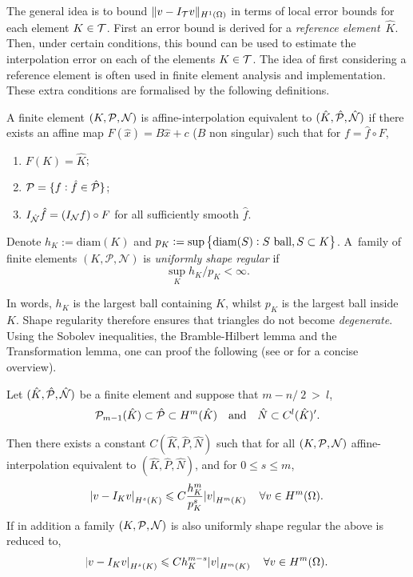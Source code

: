\documentclass[thesis.tex]{subfiles}
\begin{document}
  The general idea is to bound $\|v - I_{\mathcal{T}} v\|_{H^1(\O)}$ 
  in terms of local error bounds for each element $K \in \T$.
  First an error bound is derived for a \emph{reference element}~$\hat K$. 
  Then, under certain conditions, this bound can be used to estimate the interpolation error 
  on each of the elements $K \in \T$. The idea of first considering a reference element is often 
  used in finite element analysis and implementation. These extra conditions are formalised by the following definitions.
  \begin{defn}
    A finite element $(K, \P, \N)$ is affine-interpolation equivalent to $(\hat K, \hat \P, \hat \N)$ if there
    exists an affine map $ F(\hat x) = B\hat x + c$ ($B$ non singular) such that for $f = \hat f \circ F$,
    \begin{enumerate}[label=(\roman*)]
      \item $F(K) = \hat K$;
      \item $\P = \{f : \hat f \in \hat \P\}$;
    \item $I_{\hat \N} \hat f = \left( I_{\N} f \right)\circ F$ for all sufficiently smooth $\hat f$.
    \end{enumerate}
  \end{defn}
  \begin{defn}
    Denote $h_K := \text{diam}(K)$ and $p_K := \sup\set{\text{diam}(S): S \text{ ball}, S \subset K}$.
    A~family of finite elements $(K, \mathcal{P}, \mathcal{N})$ is \emph{uniformly shape regular} if 
    \[
      \sup_K h_K/p_K < \infty.
    \]
  \end{defn}
  In words,  $h_K$ is the largest ball containing $K$, whilst $p_K$ is the largest ball inside $K$.
  Shape regularity therefore ensures that triangles do not become \emph{degenerate}.  
  Using the Sobolev inequalities, the Bramble-Hilbert lemma and the Transformation lemma, one
  can proof the following (see \cite[Ch~3]{chen} or \cite{stevenson} for a concise overview).
  \begin{thm}
    Let $(\hat K, \hat \P, \hat \N)$ be a finite element and suppose that $m - n/~2~>~l$,
    \[
      \P_{m-1}(\hat K) \subset \hat \P \subset H^m(\hat K) \quad \text{and} \quad \hat N \subset  C^l(\hat K)'.
    \]
    
    Then there exists a constant $C(\hat K, \hat P, \hat N)$ such that for all $(K, \P, \N)$ affine-interpolation
      equivalent to $(\hat K, \hat P, \hat N)$, and for $0 \leq s \leq m$,
      \[
        \abs{v - I_K v}_{H^s(K)} \leq C \frac{h_K^{m}}{p_K^s} \abs{v}_{H^m(K)} \quad  \forall v \in H^m(\O).
      \]
      If in addition a family $(K, \P, \N)$ is also uniformly shape regular the above is reduced to,
      \[
        \abs{v - I_K v}_{H^s(K)} \leq C h_K^{m -s} \abs{v}_{H^m(K)} \quad \forall v \in H^m(\O).
      \]
  \end{thm}
\end{document}
